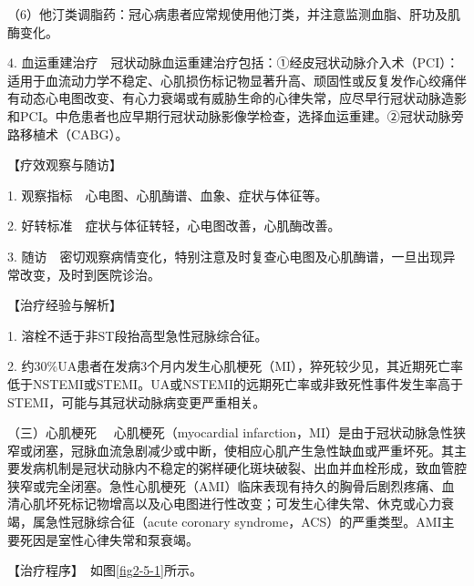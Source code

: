 （6）他汀类调脂药：冠心病患者应常规使用他汀类，并注意监测血脂、肝功及肌酶变化。

4.
血运重建治疗　冠状动脉血运重建治疗包括：①经皮冠状动脉介入术（PCI）：适用于血流动力学不稳定、心肌损伤标记物显著升高、顽固性或反复发作心绞痛伴有动态心电图改变、有心力衰竭或有威胁生命的心律失常，应尽早行冠状动脉造影和PCI。中危患者也应早期行冠状动脉影像学检查，选择血运重建。②冠状动脉旁路移植术（CABG）。

【疗效观察与随访】

1. 观察指标　心电图、心肌酶谱、血象、症状与体征等。

2. 好转标准　症状与体征转轻，心电图改善，心肌酶改善。

3.
随访　密切观察病情变化，特别注意及时复查心电图及心肌酶谱，一旦出现异常改变，及时到医院诊治。

【治疗经验与解析】

1. 溶栓不适于非ST段抬高型急性冠脉综合征。

2.
约30\%UA患者在发病3个月内发生心肌梗死（MI），猝死较少见，其近期死亡率低于NSTEMI或STEMI。UA或NSTEMI的远期死亡率或非致死性事件发生率高于STEMI，可能与其冠状动脉病变更严重相关。

{（三）心肌梗死} 　心肌梗死（myocardial
infarction，MI）是由于冠状动脉急性狭窄或闭塞，冠脉血流急剧减少或中断，使相应心肌产生急性缺血或严重坏死。其主要发病机制是冠状动脉内不稳定的粥样硬化斑块破裂、出血并血栓形成，致血管腔狭窄或完全闭塞。急性心肌梗死（AMI）临床表现有持久的胸骨后剧烈疼痛、血清心肌坏死标记物增高以及心电图进行性改变；可发生心律失常、休克或心力衰竭，属急性冠脉综合征（acute
coronary syndrome，ACS）的严重类型。AMI主要死因是室性心律失常和泵衰竭。

【治疗程序】　如图\ref{fig2-5-1}所示。

